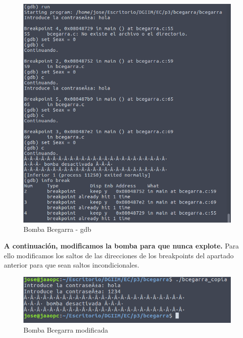 \documentclass[11pt,a4paper]{article}
\begin{document}
\begin{figure}[H] 
	\centering
	\includegraphics[scale=0.45]{capturas/bcegarra1.png} 
	\caption{Bomba Bcegarra - gdb} \label{fig:figura25}
\end{figure}

\textbf{A continuación, modificamos la bomba para que nunca explote.} Para ello modificamos los saltos de las direcciones de los breakpoints del apartado anterior para que sean saltos incondicionales. \\

\begin{figure}[H] 
	\centering
	\includegraphics[scale=0.45]{capturas/bcegarra2.png} 
	\caption{Bomba Bcegarra modificada} \label{fig:figura25}
\end{figure}
\end{document}
